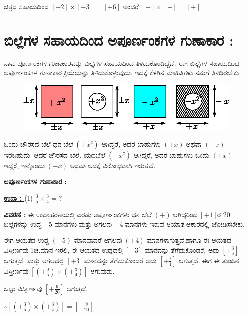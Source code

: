 ಚಿತ್ರದ ಸಹಾಯದಿಂದ $[-2]\times [-3]=[+6]$ ಅಂದರೆ $[-]\times [-]=[+]$

\section{ಬಿಲ್ಲೆಗಳ ಸಹಾಯದಿಂದ ಅಪೂರ್ಣಂಕಗಳ ಗುಣಾಕಾರ :}\label{sec3.3}%

ನಾವು ಪೂರ್ಣಂಕಗಳ ಗುಣಾಕಾರವನ್ನು ಬಿಲ್ಲೆಗಳ ಸಹಾಯದಿಂದ ತಿಳಿದುಕೊಂಡಿದ್ದೆವೆ. ಈಗ ಬಿಲ್ಲೆಗಳ ಸಹಾಯದಿಂದ ಅಪೂರ್ಣಂಕಗಳ ಗುಣಾಕಾರ ಕ್ರಿಯೆಯನ್ನು ತಿಳಿದುಕೊಳ್ಳುವುದು. ಇದಕ್ಕೆ ಕೆಳಗಿನ ಮಾಹಿತಿಗಳು ನಮಗೆ ತಿಳಿದಿರಬೇಕು.
\begin{figure}[H]
\centering
\includegraphics[scale=0.8]{src/figure/chap3/fig3-22.eps}
\end{figure}
ಒಂದು ಚೌರಸದ ಬೆಲೆ ಧನ ಬೆಲೆ $(+x^2)$ ಆಗಿದ್ದರೆ, ಅದರ ಬಾಹುಗಳು $(+x)$ ಅಥವಾ $(-x)$ ಇರಬಹುದು. ಆದರೆ ಚೌರಸದ ಬೆಲೆ. ಋಣಬೆಲೆ $(-x^2)$ ಆಗಿದ್ದರೆ, ಅದರ ಬಾಹುಗಳು ಒಂದು $(+x)$ ಇದ್ದರೆ, ಇನ್ನೊಂದು $(-x)$ ಅಥವಾ ಅದಕ್ಕೆ ವಿರೋಧವಾಗಿ ಇರುತ್ತವೆ.

\medskip
\noindent
{\textbf{\underline{ಅಪೂರ್ಣಂಕಗಳ ಗುಣಾಕಾರ :}}} 

\medskip
\noindent
{\textbf{\underline{ಉದಾ : }}} (1) $\frac{3}{5} \times \frac{3}{4} = ?$

\noindent
{\textbf{\underline{ವಿವರಣೆ :}}} ಈ ಉದಾಹರಣೆಯಲ್ಲಿ ಎರಡು ಅಪೂರ್ಣಂಕಗಳು ಧನ ಬೆಲೆ $(+)$ ಆಗಿದ್ದರಿಂದ $[+1]$ರ 20 ಬಿಲ್ಲೆಗಳನ್ನು ಉದ್ದ $+5$ ಮಾನಗಳು ಮತ್ತು ಅಗಲವು $+4$ ಮಾನಗಳು ಇರುವ ಆಯಾತ ಆಕಾರದಲ್ಲಿ ಜೋಡಿಸಬೇಕು. 

ಈಗ ಆಯತದ ಉದ್ದ $(+5)$ ಮಾನವಾದರೆ ಅಗಲವು $(+4)$ ಮಾನಗಳಾಗುತ್ತವೆ.\break ಹಾಗೂ ಈ ಆಯತದ ವಿಸ್ತೀರ್ಣವು 1ಚ.ಮಾನ ಇರಲಿ, ಈ ಆಯತದ ಉದ್ದದಲ್ಲಿ $[+3]$ ಮಾನವನ್ನು ತೆಗೆದುಕೊಂಡರೆ, ಅದು $\left[+\frac{3}{5}\right]$ ಆಗುತ್ತದೆ. ಮತ್ತು ಅಗಲದಲ್ಲಿ $[+3]$ಮಾನವನ್ನು ತೆಗೆದುಕೊಂಡರೆ ಅದು $\left[+\frac{3}{4}\right]$ ಆಗುತ್ತದೆ. ಈಗ ಈ ತುಂಡಿನ ವಿಸ್ತೀರ್ಣವು $\left[\left(+ \frac{3}{5}\right) \times \left(+\frac{3}{4}\right)\right]$ ಆಗುವುದು. 

ಒಟ್ಟು ವಿಸ್ತೀರ್ಣವು $\left[+\frac{9}{20}\right]$ ಆಗುತ್ತದೆ.

$\therefore \left[\left(+\frac{3}{5}\right) \times \left(+\frac{3}{4}\right) \right] = \left[+\frac{9}{20} \right]$

